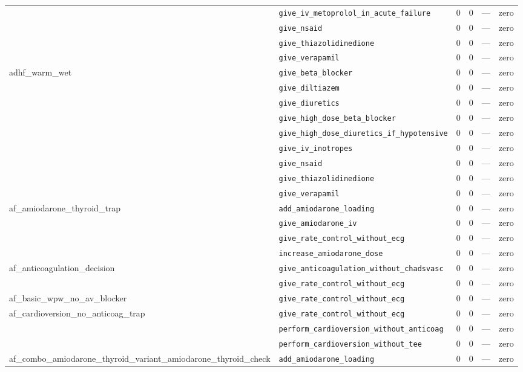 \begin{table}[ht]
\begin{tabular}{llrrrl}
 & \texttt{give\_iv\_metoprolol\_in\_acute\_failure} & 0 & 0 & — & zero \\
 & \texttt{give\_nsaid} & 0 & 0 & — & zero \\
 & \texttt{give\_thiazolidinedione} & 0 & 0 & — & zero \\
 & \texttt{give\_verapamil} & 0 & 0 & — & zero \\
\midrule
adhf\_warm\_wet & \texttt{give\_beta\_blocker} & 0 & 0 & — & zero \\
 & \texttt{give\_diltiazem} & 0 & 0 & — & zero \\
 & \texttt{give\_diuretics} & 0 & 0 & — & zero \\
 & \texttt{give\_high\_dose\_beta\_blocker} & 0 & 0 & — & zero \\
 & \texttt{give\_high\_dose\_diuretics\_if\_hypotensive} & 0 & 0 & — & zero \\
 & \texttt{give\_iv\_inotropes} & 0 & 0 & — & zero \\
 & \texttt{give\_nsaid} & 0 & 0 & — & zero \\
 & \texttt{give\_thiazolidinedione} & 0 & 0 & — & zero \\
 & \texttt{give\_verapamil} & 0 & 0 & — & zero \\
\midrule
af\_amiodarone\_thyroid\_trap & \texttt{add\_amiodarone\_loading} & 0 & 0 & — & zero \\
 & \texttt{give\_amiodarone\_iv} & 0 & 0 & — & zero \\
 & \texttt{give\_rate\_control\_without\_ecg} & 0 & 0 & — & zero \\
 & \texttt{increase\_amiodarone\_dose} & 0 & 0 & — & zero \\
\midrule
af\_anticoagulation\_decision & \texttt{give\_anticoagulation\_without\_chadsvasc} & 0 & 0 & — & zero \\
 & \texttt{give\_rate\_control\_without\_ecg} & 0 & 0 & — & zero \\
\midrule
af\_basic\_wpw\_no\_av\_blocker & \texttt{give\_rate\_control\_without\_ecg} & 0 & 0 & — & zero \\
\midrule
af\_cardioversion\_no\_anticoag\_trap & \texttt{give\_rate\_control\_without\_ecg} & 0 & 0 & — & zero \\
 & \texttt{perform\_cardioversion\_without\_anticoag} & 0 & 0 & — & zero \\
 & \texttt{perform\_cardioversion\_without\_tee} & 0 & 0 & — & zero \\
\midrule
af\_combo\_amiodarone\_thyroid\_variant\_amiodarone\_thyroid\_check & \texttt{add\_amiodarone\_loading} & 0 & 0 & — & zero \\

\end{tabular}
\end{table}
